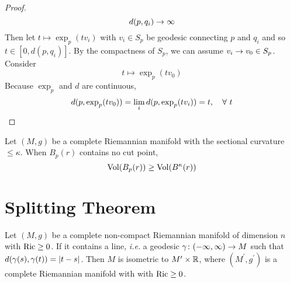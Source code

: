 \begin{enumerate}[label=\arabic{*}]
\begin{proof}
\begin{equation*}
			d(p,q_i) \rightarrow \infty
		\end{equation*}
		Then let $t \mapsto \exp_p(tv_i)$ with $v_i \in S_p$ be geodesic connecting $p$ and $q_i$ and so $t \in [0,d(p,q_i)]$. By the compactness of $S_p$, we can assume $v_i \rightarrow v_0 \in S_p$. Consider
		\begin{equation*}
			t \mapsto \exp_p(tv_0)
		\end{equation*}
		Because $\exp_p$ and $d$ are continuous,
		\begin{equation*}
			d(p,\exp_p(tv_0)) = \lim_i d(p,\exp_p(tv_i)) = t,\quad \forall~ t \qedhere
		\end{equation*}
	\end{proof}

	\begin{thm}
		Let $(M,g)$ be a complete Riemannian manifold with the sectional curvature $\leq \kappa$. When $B_p(r)$ contains no cut point,
		\begin{equation*}
			\operatorname{Vol}(B_p(r)) \geq \operatorname{Vol}(B^\kappa(r))
		\end{equation*}
	\end{thm}
\end{enumerate}

\section{Splitting Theorem}

\begin{thm}\label{thm:splitting}
	Let $(M,g)$ be a complete non-compact Riemannian manifold of dimension $n$ with $\operatorname{Ric} \geq 0$. If it contains a line, \emph{i.e.} a geodesic $\gamma \colon (-\infty,\infty) \rightarrow M$ such that $d(\gamma(s),\gamma(t)) = \left\lvert t-s\right\lvert$. Then $M$ is isometric to $M^\prime \times \mathbb{R}$, where $(M^\prime,g^\prime)$ is a complete Riemannian manifold with with $\operatorname{Ric} \geq 0$.
\end{thm}

